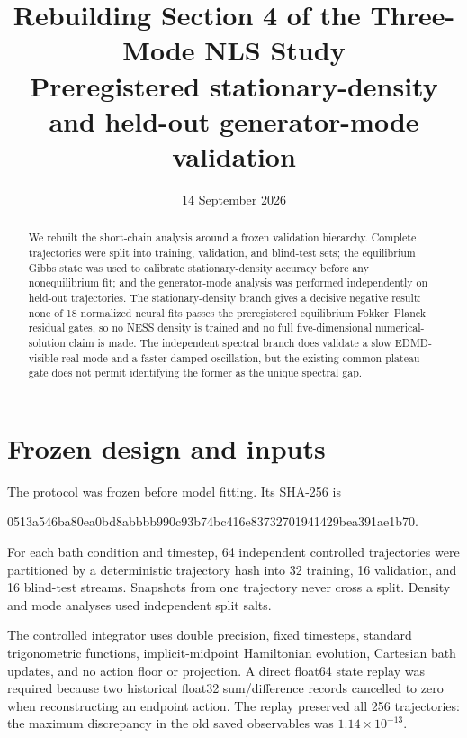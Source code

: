 \documentclass[10pt]{article}
\title{Rebuilding Section 4 of the Three-Mode NLS Study\\
\large Preregistered stationary-density and held-out generator-mode validation}
\author{}
\date{14 September 2026}
\begin{document}
\maketitle

\begin{abstract}
We rebuilt the short-chain analysis around a frozen validation hierarchy.
Complete trajectories were split into training, validation, and blind-test
sets; the equilibrium Gibbs state was used to calibrate stationary-density
accuracy before any nonequilibrium fit; and the generator-mode analysis was
performed independently on held-out trajectories.  The stationary-density
branch gives a decisive negative result: none of 18 normalized neural fits
passes the preregistered equilibrium Fokker--Planck residual gates, so no NESS
density is trained and no full five-dimensional numerical-solution claim is
made.  The independent spectral branch does validate a slow EDMD-visible real
mode and a faster damped oscillation, but the existing common-plateau gate does
not permit identifying the former as the unique spectral gap.
\end{abstract}

\section{Frozen design and inputs}

The protocol was frozen before model fitting.  Its SHA-256 is
\begin{center}
{\small\ttfamily 0513a546ba80ea0bd8abbbb990c93b74bc416e83732701941429bea391ae1b70}.
\end{center}
For each bath condition and timestep, 64 independent controlled trajectories
were partitioned by a deterministic trajectory hash into 32 training, 16
validation, and 16 blind-test streams.  Snapshots from one trajectory never
cross a split.  Density and mode analyses used independent split salts.

The controlled integrator uses double precision, fixed timesteps, standard
trigonometric functions, implicit-midpoint Hamiltonian evolution, Cartesian
bath updates, and no action floor or projection.  A direct float64 state replay
was required because two historical float32 sum/difference records cancelled
to zero when reconstructing an endpoint action.  The replay preserved all 256
trajectories: the maximum discrepancy in the old saved observables was
$1.14\times10^{-13}$.
\end{document}
